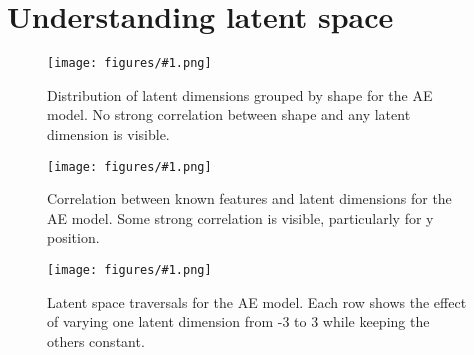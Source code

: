 \documentclass[conference,a4paper]{IEEEtran}
\newcommand{\centerfigure}[2]{
    \begin{figure}[htbp]
        \centering
        \texttt{[image: figures/\#1.png]}
        \caption{#2}
        \label{fig:#1}
    \end{figure}
}
\begin{document}
\section{Understanding latent space}

\centerfigure{ae-latent-by-shape}{Distribution of latent dimensions grouped by shape for the AE model. No strong correlation between shape and any latent dimension is visible.}

\centerfigure{ae-latent-corelation}{Correlation between known features and latent dimensions for the AE model. Some strong correlation is visible, particularly for y position.}

\centerfigure{ae-traversal-1}{Latent space traversals for the AE model. Each row shows the effect of varying one latent dimension from -3 to 3 while keeping the others constant.}
\end{document}
